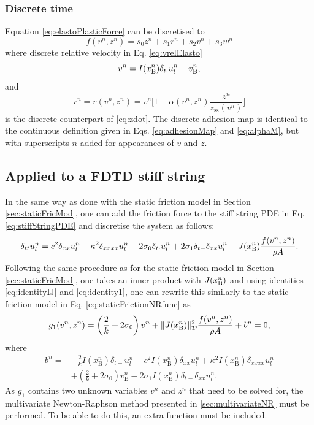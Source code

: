 \subsubsection{Discrete time}
Equation \eqref{eq:elastoPlasticForce} can be discretised to
\begin{equation}\label{eq:discForceFunction}
    f(v^n,z^n) = s_0z^n + s_1r^n+s_2v^n+s_3w^n
\end{equation} 
where discrete relative velocity in Eq. \eqref{eq:vrelElasto}
\begin{equation}\label{eq:vrelElastoDisc}
    v^n = I(x_{\text{B}}^n)\delta_{t\cdot}u_l^n - v_{\text{B}}^n,
\end{equation}
and 
\begin{equation}\label{eq:r}
    r^n = r(v^n,z^n) = v^n\bigg[1-\alpha(v^n,z^n)\frac{z^n}{z_\text{ss}(v^n)}\bigg]
\end{equation}
is the discrete counterpart of \eqref{eq:zdot}. The discrete adhesion map is identical to the continuous definition given in Eqs. \eqref{eq:adhesionMap} and \eqref{eq:alphaM}, but with superscripts $n$ added for appearances of $v$ and $z$.

\subsection{Applied to a FDTD stiff string}

In the same way as done with the static friction model in Section \ref{sec:staticFricMod}, one can add the friction force to the stiff string PDE in Eq. \eqref{eq:stiffStringPDE} and discretise the system as follows:
%
\begin{equation}\label{eq:elastoStiffStringFDS}
    \delta_{tt} u_l^n = c^2 \delta_{xx} u_l^n - \kappa^2 \delta_{xxxx} u_l^n - 2 \sigma_{0} \delta_{t\cdot} u_l^n + 2 \sigma_{1}\delta_{t-}\delta_{xx} u_l^n - J(x_{\text{B}}^n)\frac{f(v^n,z^n)}{\rho A}.
\end{equation}
Following the same procedure as for the static friction model in Section \ref{sec:staticFricMod}, one takes an inner product with $J(x_{\text{B}}^n)$ and using identities \eqref{eq:identityIJ} and \eqref{eq:identity1}, one can rewrite this similarly to the static friction model in Eq. \eqref{eq:staticFrictionNRfunc} as
%
\begin{equation}
    g_1(v^n,z^n) = \left(\frac{2}{k} + 2\sigma_{0}\right)v^n + \lVert J(x_{\text{B}}^n)\rVert_{\mathcal{D}}^2\frac{f(v^n,z^n)}{\rho A}+ b^n= 0,
\end{equation}
where
\begin{align*}
    b^n =&-\frac{2}{k}I(x_\text{B}^n)\delta_{t-}u_l^n - c^2 I(x_\text{B}^n)\delta_{xx} u_l^n +\kappa^2I(x_\text{B}^n)\delta_{xxxx} u_l^n\\
    &+\left(\frac{2}{k}+ 2\sigma_0\right)v_\text{B}^n-2\sigma_1I(x_\text{B}^n)\delta_{t-}\delta_{xx}u_l^n.
\end{align*}
As $g_1$ contains two unknown variables $v^n$ and $z^n$ that need to be solved for, the multivariate Newton-Raphson method presented in \ref{sec:multivariateNR} must be performed. To be able to do this, an extra function must be included. 


